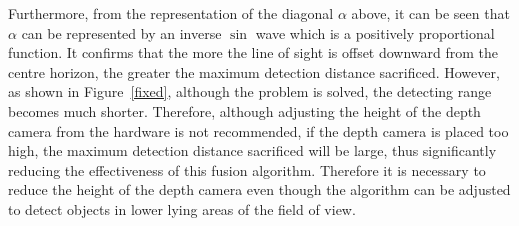 Furthermore, from the representation of the diagonal $\alpha$ above, 
it can be seen that $\alpha$ can be represented by an inverse $\sin$ wave which is a positively proportional function. 
It confirms that the more the line of sight is offset downward from the centre horizon, 
the greater the maximum detection distance sacrificed.
However, as shown in Figure~\ref{fixed}, although the problem is solved, the detecting range becomes much shorter.
Therefore, although adjusting the height of the depth camera from the hardware is not recommended, 
if the depth camera is placed too high, the maximum detection distance sacrificed will be large, 
thus significantly reducing the effectiveness of this fusion algorithm. 
Therefore it is necessary to reduce the height of the depth camera even though the algorithm can be adjusted to detect objects in lower lying areas of the field of view.

